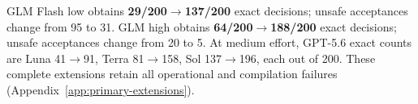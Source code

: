 GLM Flash low obtains \textbf{29/200$\to$137/200} exact decisions; unsafe acceptances change from 95 to 31. GLM high obtains \textbf{64/200$\to$188/200} exact decisions; unsafe acceptances change from 20 to 5. At medium effort, GPT-5.6 exact counts are Luna 41$\to$91, Terra 81$\to$158, Sol 137$\to$196, each out of 200. These complete extensions retain all operational and compilation failures (Appendix~\ref{app:primary-extensions}).
